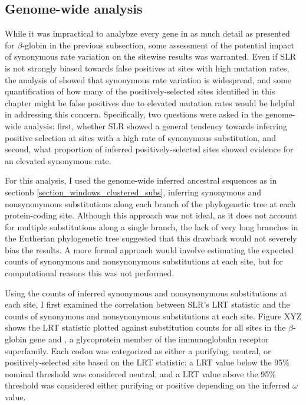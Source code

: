 \subsection{Genome-wide analysis}

While it was impractical to analybze every gene in as much detail as
presented for $\beta$-globin in the previous subsection, some
assessment of the potential impact of synonymous rate variation on the
sitewise results was warranted. Even if SLR is not strongly biased
towards false positives at sites with high mutation rates, the
analysis of \citet{Pond2005b} showed that synonymous rate variation is
widespread, and some quantification of how many of the
positively-selected sites identified in this chapter might be false
positives due to elevated mutation rates would be helpful in
addressing this concern. Specifically, two questions were asked in the
genome-wide analysis: first, whether SLR showed a general tendency
towards inferring positive selection at sites with a high rate of
synonymous substitution, and second, what proportion of inferred
positively-selected sites showed evidence for an elevated synonymous
rate.

For this analysis, I used the genome-wide inferred ancestral sequences
as in sectionb \ref{section_windows_clustered_subs}, inferring
synonymous and nonsynonymous substitutions along each branch of the
phylogenetic tree at each protein-coding site. Although this approach
was not ideal, as it does not account for multiple substitutions along
a single branch, the lack of very long branches in the Eutherian
phylogenetic tree suggested that this drawback would not severely bias
the results. A more formal approach would involve estimating the
expected counts of synonymous and nonsynonymous substitutions at each
site, but for computational reasons this was not performed.

Using the counts of inferred synonymous and nonsynonymous
substitutions at each site, I first examined the correlation between
SLR's LRT statistic and the counts of synonymous and nonsynonymous
substitutions at each site. Figure XYZ shows the LRT statistic plotted
against substitution counts for all sites in the $\beta$-globin gene
and , a glycoprotein member of the immunoglobulin receptor
superfamily. Each codon was categorized as either a purifying,
neutral, or positively-selected site based on the LRT statistic: a LRT
value below the 95\% nominal threshold was considered neutral, and a
LRT value above the 95\% threshold was considered either purifying or
positive depending on the inferred $\omega$ value.

